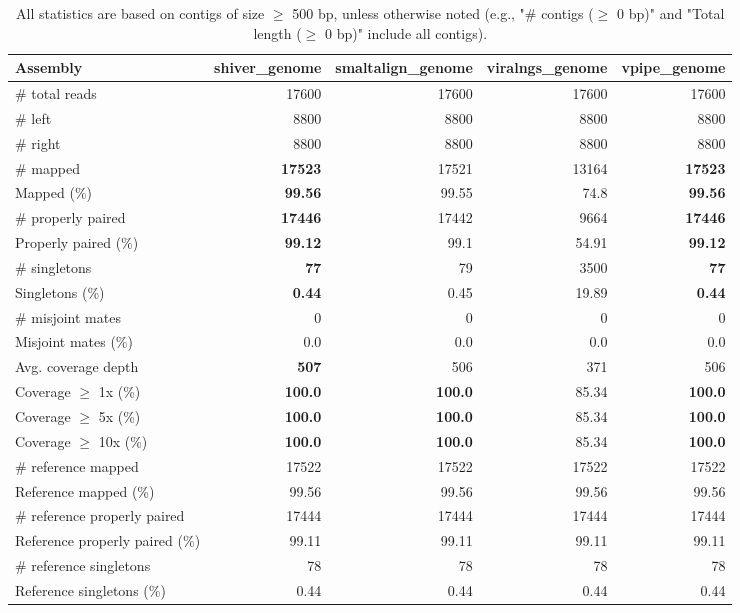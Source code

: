 \documentclass[12pt,a4paper]{article}
\begin{document}
\begin{table}[ht]
\begin{center}
\caption{All statistics are based on contigs of size $\geq$ 500 bp, unless otherwise noted (e.g., "\# contigs ($\geq$ 0 bp)" and "Total length ($\geq$ 0 bp)" include all contigs).}
\begin{tabular}{|l*{4}{|r}|}
\hline
Assembly & shiver\_genome & smaltalign\_genome & viralngs\_genome & vpipe\_genome \\ \hline
\# total reads & 17600 & 17600 & 17600 & 17600 \\ \hline
\# left & 8800 & 8800 & 8800 & 8800 \\ \hline
\# right & 8800 & 8800 & 8800 & 8800 \\ \hline
\# mapped & {\bf 17523} & 17521 & 13164 & {\bf 17523} \\ \hline
Mapped (\%) & {\bf 99.56} & 99.55 & 74.8 & {\bf 99.56} \\ \hline
\# properly paired & {\bf 17446} & 17442 & 9664 & {\bf 17446} \\ \hline
Properly paired (\%) & {\bf 99.12} & 99.1 & 54.91 & {\bf 99.12} \\ \hline
\# singletons & {\bf 77} & 79 & 3500 & {\bf 77} \\ \hline
Singletons (\%) & {\bf 0.44} & 0.45 & 19.89 & {\bf 0.44} \\ \hline
\# misjoint mates & 0 & 0 & 0 & 0 \\ \hline
Misjoint mates (\%) & 0.0 & 0.0 & 0.0 & 0.0 \\ \hline
Avg. coverage depth & {\bf 507} & 506 & 371 & 506 \\ \hline
Coverage $\geq$ 1x (\%) & {\bf 100.0} & {\bf 100.0} & 85.34 & {\bf 100.0} \\ \hline
Coverage $\geq$ 5x (\%) & {\bf 100.0} & {\bf 100.0} & 85.34 & {\bf 100.0} \\ \hline
Coverage $\geq$ 10x (\%) & {\bf 100.0} & {\bf 100.0} & 85.34 & {\bf 100.0} \\ \hline
\# reference mapped & 17522 & 17522 & 17522 & 17522 \\ \hline
Reference mapped (\%) & 99.56 & 99.56 & 99.56 & 99.56 \\ \hline
\# reference properly paired & 17444 & 17444 & 17444 & 17444 \\ \hline
Reference properly paired (\%) & 99.11 & 99.11 & 99.11 & 99.11 \\ \hline
\# reference singletons & 78 & 78 & 78 & 78 \\ \hline
Reference singletons (\%) & 0.44 & 0.44 & 0.44 & 0.44 \\ \hline

\end{tabular}
\end{center}
\end{table}
\end{document}
